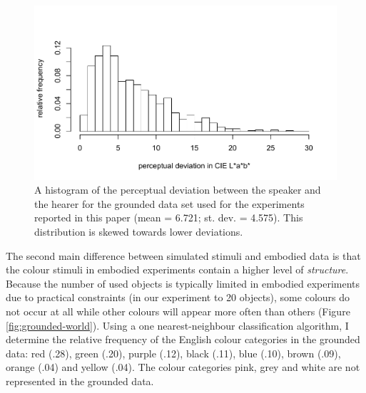 \begin{figure}[htbp]
\begin{center}
\includegraphics[width=.9\textwidth]{./experiments/figures/grounding-perceptual-deviation.pdf}
\caption[Perceptual deviation between the speaker and the hearer]{A
  histogram of the perceptual deviation between the speaker and the
  hearer for the grounded data set used for the experiments reported
  in this paper (mean = 6.721; st. dev. = 4.575). This distribution is
  skewed towards lower deviations.}
\label{f:perceptual-deviation}
\end{center}
\end{figure}

The second main difference between simulated stimuli and embodied data
is that the colour stimuli in embodied experiments contain a higher
level of \emph{structure}. Because the number of used objects is
typically limited in embodied experiments due to practical constraints
(in our experiment to 20 objects), some colours do not occur at all
while other colours will appear more often than others (Figure
\ref{fig:grounded-world}). Using a one nearest-neighbour
classification algorithm, I determine the relative frequency of the
English colour categories \citep{sturges95location} in the grounded
data: red (.28), green (.20), purple (.12), black (.11), blue (.10),
brown (.09), orange (.04) and yellow (.04). The colour categories
pink, grey and white are not represented in the grounded data.

